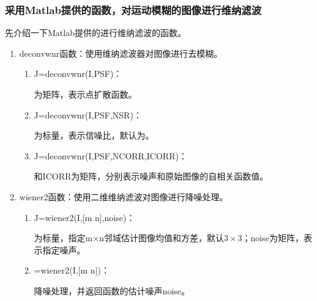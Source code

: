 \documentclass[UTF8]{ctexart}
\begin{document}
    \subsubsection{采用Matlab提供的函数，对运动模糊的图像进行维纳滤波}
    先介绍一下Matlab提供的进行维纳滤波的函数。
    \begin{enumerate}[label=(\arabic*),itemindent=1.5em]
        \item {\ttfamily deconvwnr}函数：使用维纳滤波器对图像进行去模糊。
        \begin{enumerate}[itemindent=1em]
            \item {\ttfamily J=deconvwnr(I,PSF)}：
            \par\setlength\parindent{1em}{\ttfamily PSF}为矩阵，表示点扩散函数。
            \item {\ttfamily J=deconvwnr(I,PSF,NSR)}：
            \par\setlength\parindent{1em}{\ttfamily NSR}为标量，表示信噪比，默认为{}。
            \item {\ttfamily J=deconvwnr(I,PSF,NCORR,ICORR)}：
            \par\setlength\parindent{1em}{\ttfamily NCORR}和{\ttfamily ICORR}为矩阵，分别表示噪声和原始图像的自相关函数值。
        \end{enumerate}
        \item {\ttfamily wiener2}函数：使用二维维纳滤波对图像进行降噪处理。
        \begin{enumerate}[itemindent=1em]
            \item {\ttfamily J=wiener2(I,[m n],noise)}：
            \par\setlength\parindent{1em}{\ttfamily m,n}为标量，指定{\ttfamily m}$\times${\ttfamily n}邻域估计图像均值和方差，默认$3\times3$；{\ttfamily noise}为矩阵，表示指定噪声。
            \item {\ttfamily [J,noise]=wiener2(I,[m n])}：
            \par\setlength\parindent{1em}降噪处理，并返回函数的估计噪声{\ttfamily noise}。
        \end{enumerate}
    \end{enumerate}
\end{document}
